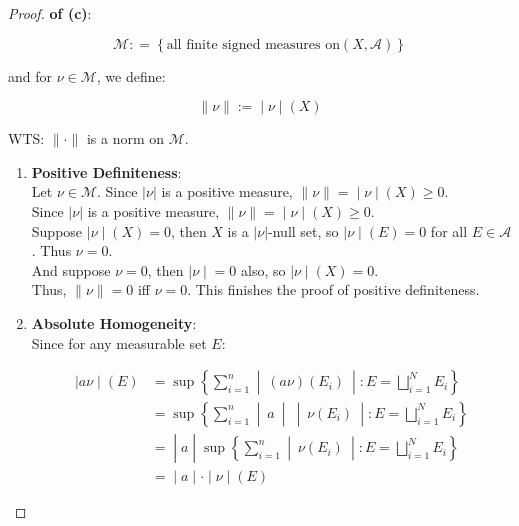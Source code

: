 \documentclass{qlnotes-export}
\begin{document}
\begin{proof}

\textbf{of (c)}:

\[\mathcal{M}: = \left\{ {\text{all finite signed measures on}(X,\mathcal{A})} \right\}\]

and for \(\nu \in \mathcal{M}\), we define:

\[\left. \parallel \nu \parallel := \middle| \nu \middle| (X) \right.\]

WTS: \(\parallel \cdot \parallel\) is a norm on \(\mathcal{M}\).\\

\begin{enumerate}
\item
  \textbf{Positive Definiteness}:\\
  Let \(\nu \in \mathcal{M}\). Since \(|\nu|\) is a positive measure, \(\left. \parallel \nu \parallel = \middle| \nu \middle| (X) \geq 0 \right.\).\\
  Since \(|\nu|\) is a positive measure, \(\left. \parallel \nu \parallel = \middle| \nu \middle| (X) \geq 0 \right.\).\\
  Suppose \(\left. |\nu \middle| (X) = 0 \right.\), then \(X\) is a \(|\nu|\)-null set, so \(\left. |\nu \middle| (E) = 0 \right.\) for all \(E \in \mathcal{A}\). Thus \(\nu = 0\).\\
  And suppose \(\nu = 0\), then \(\left. |\nu \middle| = 0 \right.\) also, so \(\left. |\nu \middle| (X) = 0 \right.\).\\
  Thus, \(\parallel \nu \parallel = 0\) iff \(\nu = 0\). This finishes the proof of positive definiteness.
\item
  \textbf{Absolute Homogeneity}:\\
  Since for any measurable set \(E\):

  \[\begin{matrix}
  \left. |a\nu \middle| (E) \right. & {= \sup\left\{ \sum\limits_{i = 1}^{n} \middle| \ (a\nu)(E_{i})\  \middle| :E = \bigsqcup\limits_{i = 1}^{N}E_{i} \right\}} \\
   & {= \sup\left\{ \sum\limits_{i = 1}^{n} \middle| \ a\  \middle| \  \middle| \ \nu(E_{i})\  \middle| :E = \bigsqcup\limits_{i = 1}^{N}E_{i} \right\}} \\
   & \left. = \middle| a \middle| \sup\left\{ \sum\limits_{i = 1}^{n} \middle| \ \nu(E_{i})\  \middle| :E = \bigsqcup\limits_{i = 1}^{N}E_{i} \right\} \right. \\
   & \left. = \middle| a \middle| \cdot \middle| \nu \middle| (E) \right.
  \end{matrix}\]


\end{enumerate}
\end{proof}
\end{document}
